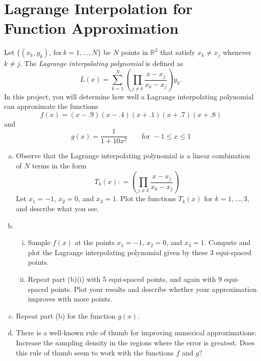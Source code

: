 
\section{Lagrange Interpolation for Function Approximation}
Let $\{(x_k,y_k) ,\,\text{for}\, k = 1, \dots, N\}$ be $N$ points in $\mathbb{R}^2$ that satisfy $x_k \neq x_j$ whenever $k \neq j$. The \textit{Lagrange interpolating polynomial} is defined as
\begin{equation}
L(x) = \sum_{k = 1}^N \left(\prod_{j \neq k}\frac{x-x_j}{x_k-x_j} \right) y_k.
\end{equation}
In this project, you will determine how well a Lagrange interpolating polynomial can approximate the functions 
\begin{equation}
f(x) = (x-.9)(x-.4)(x+.1)(x+.7)(x+.8)
\end{equation}
and 
\begin{equation}
g(x) = \frac{1}{1+10x^2} \quad \quad \text{for } -1 \leq x \leq 1
\end{equation}
\begin{enumerate}[(a)]
    \item Observe that the Lagrange interpolating polynomial is a linear combination of $N$ terms in the form
    \begin{equation}
    T_k(x): =\left( \prod_{j \neq k}\frac{x-x_j}{x_k-x_j}  \right) 
    \end{equation}
    Let $x_1= -1$, $x_2 = 0$, and $x_3 = 1$. Plot the functions $T_k(x)$ for $k = 1,\dots,3$, and describe what you see.
    \item 
    \begin{enumerate}[i.]
      \item Sample $f(x)$ at the points $x_1 = -1$, $x_2 = 0$, and $x_3= 1$. Compute and plot the Lagrange interpolating polynomial given by these 3 equi-spaced points.
      \item Repeat part (b)(i) with 5 equi-spaced points, and again with 9 equi-spaced points. Plot your results and describe whether your approximation improves with more points. 
    \end{enumerate}
    \item Repeat part (b) for the function $g(x)$.
    \item There is a well-known rule of thumb for improving numerical approximations: Increase the sampling density in the regions where the error is greatest. Does this rule of thumb seem to work with the functions $f$ and $g$?
\end{enumerate}

